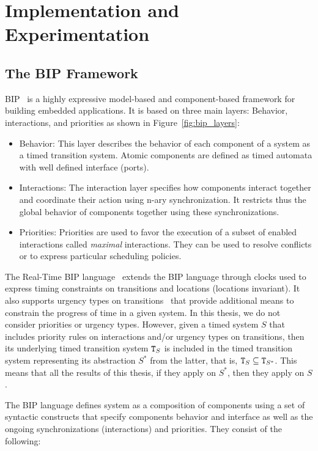 \chapter{Implementation and Experimentation}
\label{chap:7}
\minitoc
\section{The BIP Framework}

BIP~\cite{intro:bip} is a highly expressive model-based and component-based framework for 
building embedded applications. It is based on three main layers: Behavior, interactions, and
priorities as shown in Figure~\ref{fig:bip_layers}:

\begin{itemize}
  \item Behavior: This layer describes the behavior of each component of a system as a timed
    transition system. Atomic components are defined as timed automata with well defined 
    interface (ports).
  \item Interactions: The interaction layer specifies how components interact together and
    coordinate their action using n-ary synchronization. It restricts thus the global behavior 
    of components together using these synchronizations.
  \item Priorities: Priorities are used to favor the execution of a subset of enabled 
    interactions called \emph{maximal} interactions. They can be used to resolve conflicts or to
    express particular scheduling policies.
\end{itemize}

The Real-Time BIP language~\cite{rtbip} extends the BIP language through clocks used to express
timing constraints on transitions and locations (locations invariant). 
It also supports urgency types on transitions~\cite{urg} that provide additional means to 
constrain the progress of time in a given system.
In this thesis, we do not consider priorities or urgency types. However, given a timed system
$S$ that includes priority rules on interactions and/or urgency types on transitions, 
then its underlying timed transition system $\texttt{T}_S$ is included in the timed
transition system representing its abstraction $S^*$ from the latter, that is,
$\texttt{T}_S\subseteq\texttt{T}_{S^*}$. This means that all the results of this thesis, if they apply
on $S^*$, then they apply on $S$.

The BIP language defines system as a composition of components using a set of syntactic
constructs that specify components behavior and interface as well as the ongoing 
synchronizations (interactions) and priorities. They consist of the following:


